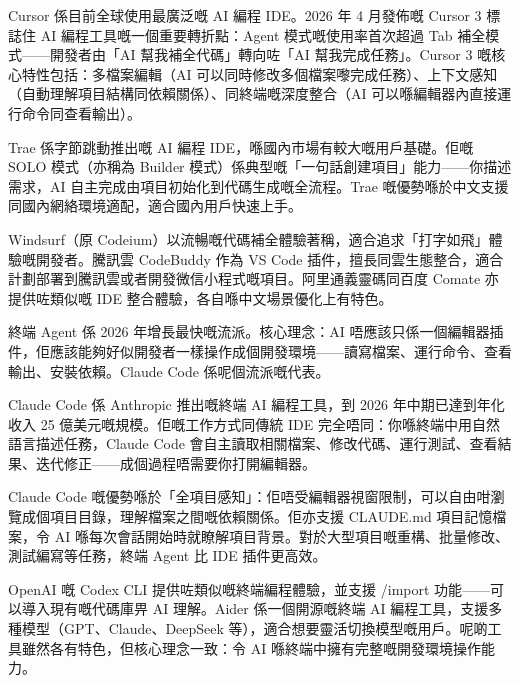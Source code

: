 Cursor 係目前全球使用最廣泛嘅 AI 編程 IDE。2026 年 4 月發佈嘅 Cursor 3 標誌住 AI 編程工具嘅一個重要轉折點：Agent 模式嘅使用率首次超過 Tab 補全模式——開發者由「AI 幫我補全代碼」轉向咗「AI 幫我完成任務」。Cursor 3 嘅核心特性包括：多檔案編輯（AI 可以同時修改多個檔案嚟完成任務）、上下文感知（自動理解項目結構同依賴關係）、同終端嘅深度整合（AI 可以喺編輯器內直接運行命令同查看輸出）。


Trae 係字節跳動推出嘅 AI 編程 IDE，喺國內市場有較大嘅用戶基礎。佢嘅 SOLO 模式（亦稱為 Builder 模式）係典型嘅「一句話創建項目」能力——你描述需求，AI 自主完成由項目初始化到代碼生成嘅全流程。Trae 嘅優勢喺於中文支援同國內網絡環境適配，適合國內用戶快速上手。


Windsurf（原 Codeium）以流暢嘅代碼補全體驗著稱，適合追求「打字如飛」體驗嘅開發者。騰訊雲 CodeBuddy 作為 VS Code 插件，擅長同雲生態整合，適合計劃部署到騰訊雲或者開發微信小程式嘅項目。阿里通義靈碼同百度 Comate 亦提供咗類似嘅 IDE 整合體驗，各自喺中文場景優化上有特色。


終端 Agent 係 2026 年增長最快嘅流派。核心理念：AI 唔應該只係一個編輯器插件，佢應該能夠好似開發者一樣操作成個開發環境——讀寫檔案、運行命令、查看輸出、安裝依賴。Claude Code 係呢個流派嘅代表。


Claude Code 係 Anthropic 推出嘅終端 AI 編程工具，到 2026 年中期已達到年化收入 25 億美元嘅規模。佢嘅工作方式同傳統 IDE 完全唔同：你喺終端中用自然語言描述任務，Claude Code 會自主讀取相關檔案、修改代碼、運行測試、查看結果、迭代修正——成個過程唔需要你打開編輯器。

Claude Code 嘅優勢喺於「全項目感知」：佢唔受編輯器視窗限制，可以自由咁瀏覽成個項目目錄，理解檔案之間嘅依賴關係。佢亦支援 CLAUDE.md 項目記憶檔案，令 AI 喺每次會話開始時就瞭解項目背景。對於大型項目嘅重構、批量修改、測試編寫等任務，終端 Agent 比 IDE 插件更高效。


OpenAI 嘅 Codex CLI 提供咗類似嘅終端編程體驗，並支援 /import 功能——可以導入現有嘅代碼庫畀 AI 理解。Aider 係一個開源嘅終端 AI 編程工具，支援多種模型（GPT、Claude、DeepSeek 等），適合想要靈活切換模型嘅用戶。呢啲工具雖然各有特色，但核心理念一致：令 AI 喺終端中擁有完整嘅開發環境操作能力。


